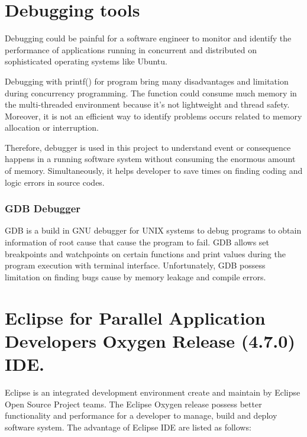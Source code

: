 \section{Debugging tools}

Debugging could be painful for a software engineer to monitor and identify the performance of applications running in concurrent and distributed on sophisticated operating systems like Ubuntu. 

Debugging with printf() for program bring many disadvantages and limitation during concurrency programming. The function could consume much memory in the multi-threaded environment because it’s not lightweight and thread safety. \cite{printf-bad} Moreover, it is not an efficient way to identify problems occurs related to memory allocation or interruption.

Therefore, debugger is used in this project to understand event or consequence happens in a running software system without consuming the enormous amount of memory. Simultaneously, it helps developer to save times on finding coding and logic errors in source codes.  \cite{what-is-tracing} 

\subsubsection{GDB Debugger}

GDB is a build in GNU debugger for UNIX systems to debug programs to obtain information of root cause that cause the program to fail. \cite{what-is-debugger} GDB allows set breakpoints and watchpoints on certain functions and print values during the program execution with terminal interface. Unfortunately, GDB possess limitation on finding bugs cause by memory leakage and compile errors.

\section{Eclipse for Parallel Application Developers Oxygen Release (4.7.0) IDE.} 

Eclipse is an integrated development environment create and maintain by Eclipse Open Source Project teams. The Eclipse Oxygen release possess better functionality and performance for a developer to manage, build and deploy software system. The advantage of Eclipse IDE are listed as follows: 


